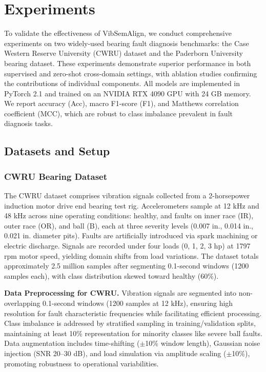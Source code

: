 \section{Experiments}

To validate the effectiveness of VibSemAlign, we conduct comprehensive experiments on two widely-used bearing fault diagnosis benchmarks: the Case Western Reserve University (CWRU) dataset and the Paderborn University bearing dataset. These experiments demonstrate superior performance in both supervised and zero-shot cross-domain settings, with ablation studies confirming the contributions of individual components. All models are implemented in PyTorch 2.1 and trained on an NVIDIA RTX 4090 GPU with 24 GB memory. We report accuracy (Acc), macro F1-score (F1), and Matthews correlation coefficient (MCC), which are robust to class imbalance prevalent in fault diagnosis tasks.

\subsection{Datasets and Setup}

\subsubsection{CWRU Bearing Dataset}
The CWRU dataset \cite{casewestern2010} comprises vibration signals collected from a 2-horsepower induction motor drive end bearing test rig. Accelerometers sample at 12 kHz and 48 kHz across nine operating conditions: healthy, and faults on inner race (IR), outer race (OR), and ball (B), each at three severity levels (0.007 in., 0.014 in., 0.021 in. diameter pits). Faults are artificially introduced via spark machining or electric discharge. Signals are recorded under four loads (0, 1, 2, 3 hp) at 1797 rpm motor speed, yielding domain shifts from load variations. The dataset totals approximately 2.5 million samples after segmenting 0.1-second windows (1200 samples each), with class distribution skewed toward healthy (60\%).

\noindent\textbf{Data Preprocessing for CWRU.} Vibration signals are segmented into non-overlapping 0.1-second windows (1200 samples at 12 kHz), ensuring high resolution for fault characteristic frequencies while facilitating efficient processing. Class imbalance is addressed by stratified sampling in training/validation splits, maintaining at least 10\% representation for minority classes like severe ball faults. Data augmentation includes time-shifting ($\pm$10\% window length), Gaussian noise injection (SNR 20--30 dB), and load simulation via amplitude scaling ($\pm$10\%), promoting robustness to operational variabilities.


